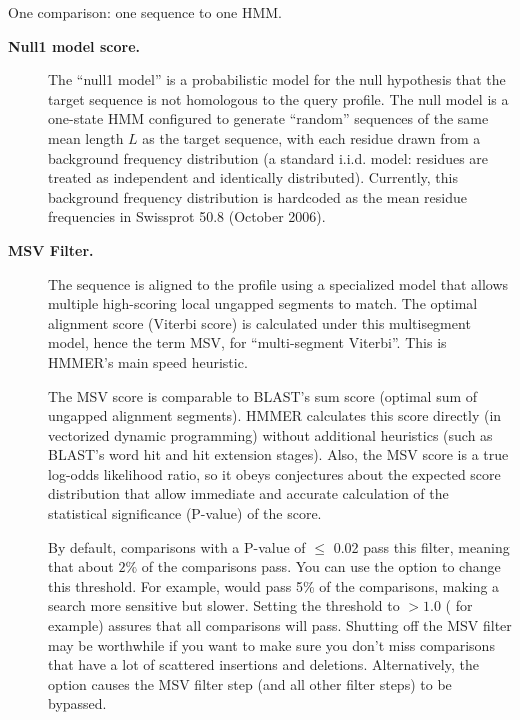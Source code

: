 One comparison: one sequence to one HMM.

\begin{description}

\item[\textbf{Null1 model score.}]  

  The ``null1 model'' is a probabilistic model for the null hypothesis
  that the target sequence is not homologous to the query profile. The
  null model is a one-state HMM configured to generate ``random''
  sequences of the same mean length $L$ as the target sequence, with
  each residue drawn from a background frequency distribution (a
  standard i.i.d. model: residues are treated as independent and
  identically distributed). Currently, this background frequency
  distribution is hardcoded as the mean residue frequencies in
  Swissprot 50.8 (October 2006).

\item[\textbf{MSV Filter.}] 

 The sequence is aligned to the profile using a specialized model that
 allows multiple high-scoring local ungapped segments to match.  The
 optimal alignment score (Viterbi score) is calculated under this
 multisegment model, hence the term MSV, for ``multi-segment
 Viterbi''. This is HMMER's main speed heuristic.

 The MSV score is comparable to BLAST's sum score (optimal sum of
 ungapped alignment segments). HMMER calculates this score directly
 (in vectorized dynamic programming) without additional heuristics
 (such as BLAST's word hit and hit extension stages). Also, the MSV
 score is a true log-odds likelihood ratio, so it obeys conjectures
 about the expected score distribution \citep{Eddy08} that allow
 immediate and accurate calculation of the statistical significance
 (P-value) of the score.

 By default, comparisons with a P-value of $\leq$ 0.02 pass this
 filter, meaning that about $2\%$ of the comparisons pass. You can use
 the  option to change this threshold. For example,
  would pass 5\% of the comparisons, making a
 search more sensitive but slower. Setting the threshold to $>1.0$
 ( for example) assures that all comparisons will
 pass. Shutting off the MSV filter may be worthwhile if you want to
 make sure you don't miss comparisons that have a lot of scattered
 insertions and deletions. Alternatively, the  option
 causes the MSV filter step (and all other filter steps) to be
 bypassed.


\end{description}
